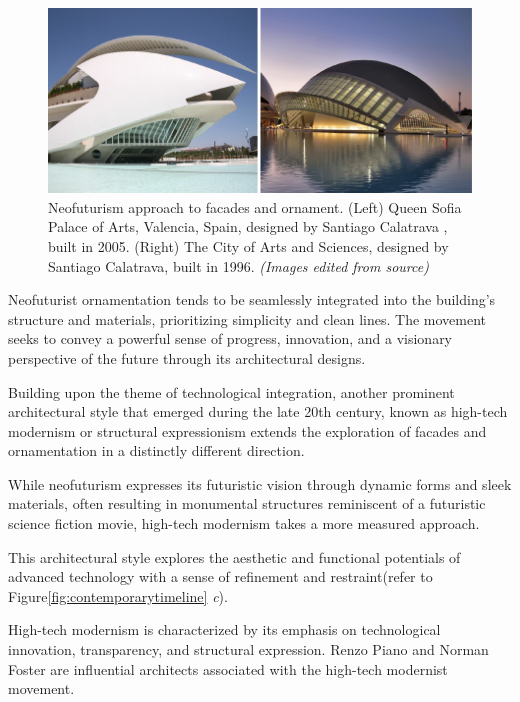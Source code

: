      \begin{figure}[htb]
          \centering
          \includegraphics[width= \linewidth]{Images/neofuturism}
          \caption{Neofuturism approach to facades and ornament. (Left) Queen Sofia Palace of Arts, Valencia, Spain, designed by Santiago Calatrava , built in 2005. (Right) The City of Arts and Sciences, designed by Santiago Calatrava, built in 1996. \textit{(Images edited from source)}}
          \label{fig:neofuturism}
        \end{figure}

Neofuturist ornamentation tends to be seamlessly integrated into the building's structure and materials, prioritizing simplicity and clean lines.
The movement seeks to convey a powerful sense of progress, innovation, and a visionary perspective of the future through its architectural designs.


Building upon the theme of technological integration, another prominent architectural style that emerged during the late 20th century, known as high-tech modernism or structural expressionism extends the exploration of facades and ornamentation in a distinctly different direction.

While neofuturism expresses its futuristic vision through dynamic forms and sleek materials, often resulting in monumental structures reminiscent of a futuristic science fiction movie, high-tech modernism takes a more measured approach.

This architectural style explores the aesthetic and functional potentials of advanced technology with a sense of refinement and restraint(refer to Figure\ref{fig:contemporarytimeline} \textit{c}).

High-tech modernism is characterized by its emphasis on technological innovation, transparency, and structural expression.
Renzo Piano and Norman Foster are influential architects associated with the high-tech modernist movement\cite{Tyc2018}.


